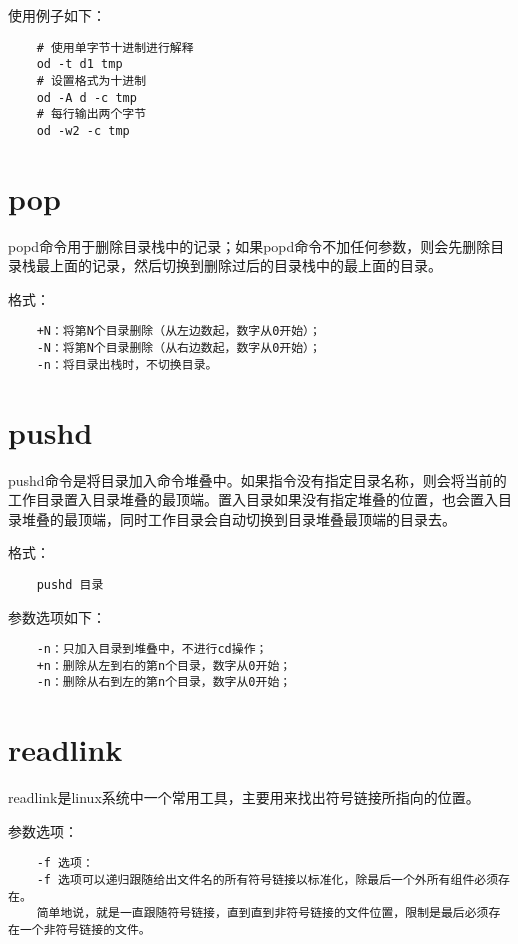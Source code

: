 \documentclass[a4paper,left=2.5cm,right=2.5cm,11pt]{article}
\begin{document}
	使用例子如下：
	\begin{lstlisting}
	# 使用单字节十进制进行解释
	od -t d1 tmp
	# 设置格式为十进制
	od -A d -c tmp
	# 每行输出两个字节
	od -w2 -c tmp
	\end{lstlisting}

\section{pop}
	popd命令用于删除目录栈中的记录；如果popd命令不加任何参数，则会先删除目录栈最上面的记录，然后切换到删除过后的目录栈中的最上面的目录。\par

	格式：
	\begin{lstlisting}
	+N：将第N个目录删除（从左边数起，数字从0开始）； 
	-N：将第N个目录删除（从右边数起，数字从0开始）； 
	-n：将目录出栈时，不切换目录。
	\end{lstlisting}

\section{pushd}
	pushd命令是将目录加入命令堆叠中。如果指令没有指定目录名称，则会将当前的工作目录置入目录堆叠的最顶端。置入目录如果没有指定堆叠的位置，也会置入目录堆叠的最顶端，同时工作目录会自动切换到目录堆叠最顶端的目录去。\par

	格式：
	\begin{lstlisting}
	pushd 目录
	\end{lstlisting}

	参数选项如下：
	\begin{lstlisting}
	-n：只加入目录到堆叠中，不进行cd操作； 
	+n：删除从左到右的第n个目录，数字从0开始； 
	-n：删除从右到左的第n个目录，数字从0开始；
	\end{lstlisting}

\section{readlink}
	readlink是linux系统中一个常用工具，主要用来找出符号链接所指向的位置。\par

	参数选项：
	\begin{lstlisting}
	-f 选项：
	-f 选项可以递归跟随给出文件名的所有符号链接以标准化，除最后一个外所有组件必须存在。
	简单地说，就是一直跟随符号链接，直到直到非符号链接的文件位置，限制是最后必须存在一个非符号链接的文件。
	\end{lstlisting}
\end{document}
